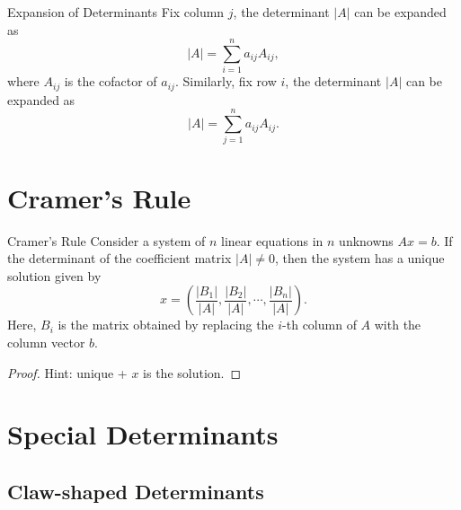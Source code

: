 \begin{proposition}{Expansion of Determinants}{}
  Fix column $j$, the determinant $|A|$ can be expanded as
  \begin{equation}
    |A| = \sum\limits_{i = 1}^n a_{ij} A_{ij},
  \end{equation}
  where $A_{ij}$ is the cofactor of $a_{ij}$.
  Similarly, fix row $i$, the determinant $|A|$ can be expanded as
  \begin{equation}
    |A| = \sum\limits_{j = 1}^n a_{ij} A_{ij}.
  \end{equation}
\end{proposition}

\section{Cramer's Rule}

\begin{theorem}{Cramer's Rule}{}
  Consider a system of $n$ linear equations in $n$ unknowns $Ax = b$.
  If the determinant of the coefficient matrix $|A| \neq 0$,
  then the system has a unique solution given by
  \begin{equation}
    x = \left( \frac{|B_1|}{|A|}, \frac{|B_2|}{|A|}, \cdots, \frac{|B_n|}{|A|} \right).
  \end{equation}
  Here, $B_i$ is the matrix obtained by replacing the $i$-th column of $A$
  with the column vector $b$.
\end{theorem}

\begin{proof}
  Hint: unique + $x$ is the solution.
\end{proof}


\section{Special Determinants}

\subsection{Claw-shaped Determinants}






